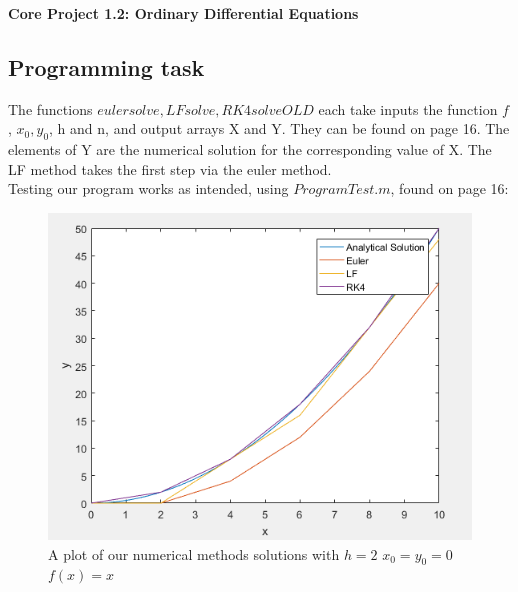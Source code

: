 \documentclass[10pt,a4paper]{report}
\begin{document}
\textbf{Core Project 1.2: Ordinary Differential Equations}
\thispagestyle{empty}

\newpage


\subsection*{Programming task}

The functions $eulersolve, LFsolve, RK4solveOLD$ each take inputs the function $f$, $x_0, y_0$, h and n, and output arrays X and Y. They can be found on page 16. The elements of Y are the numerical solution for the corresponding value of X. The LF method takes the first step via the euler method. \\

Testing our program works as intended, using $ProgramTest.m$, found on page 16: 

\begin{figure}[H]
\centering
\includegraphics[scale=0.8]{test}
\caption{A plot of our numerical methods solutions with $h=2$ $x_0=y_0=0$ $f(x)=x$}
\end{figure}
\end{document}
